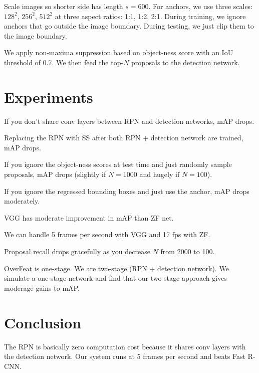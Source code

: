 \documentclass[a4paper]{article}
\begin{document}
Scale images so shorter side has length $s = 600$. For anchors, we use
three scales: $128^2$, $256^2$, $512^2$ at three aspect ratios: 1:1, 1:2, 2:1.
During training, we ignore anchors that go outside the image boundary. During
testing, we just clip them to the image boundary.

We apply non-maxima suppression based on object-ness score with an IoU threshold
of 0.7. We then feed the top-$N$ proposals to the detection network.

\section{Experiments}
If you don't share conv layers between RPN and detection networks, mAP drops.

Replacing the RPN with SS after both RPN + detection network are trained, mAP
drops.

If you ignore the object-ness scores at test time and just randomly
sample proposals, mAP drops (slightly if $N = 1000$ and hugely if $N = 100$).

If you ignore the regressed bounding boxes and just use the anchor, mAP drops
moderately.

VGG has moderate improvement in mAP than ZF net.

We can handle 5 frames per second with VGG and 17 fps with ZF.

Proposal recall drops gracefully as you decrease $N$ from 2000 to 100.

OverFeat is one-stage. We are two-stage (RPN + detection network). We simulate
a one-stage network and find that our two-stage approach gives moderage gains
to mAP.

\section{Conclusion}
The RPN is basically zero computation cost because it shares conv layers with
the detection network. Our system runs at 5 frames per second and beats
Fast R-CNN.
\end{document}
